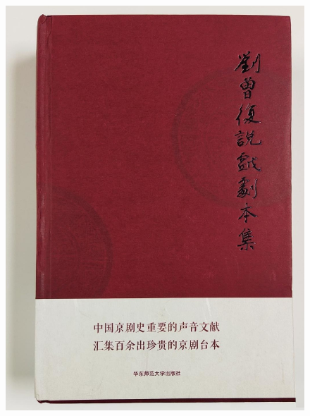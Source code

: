 \newpage
\begin{figure}[h!]
\centering
\includegraphics[height=1.30\textwidth,width=1.02\textwidth,viewport=0 0 1030 1400,clip]{Figures_Peking-Opera/Liu_script.jpg}
\caption*{\hei \fontsize{8.5pt}{4.0pt}\selectfont{《刘曾复说戏剧本集》初版~(上海~华东师范大学出版社~2015.08)~书影}}
\label{Peking_Opera_Script}
\end{figure}

